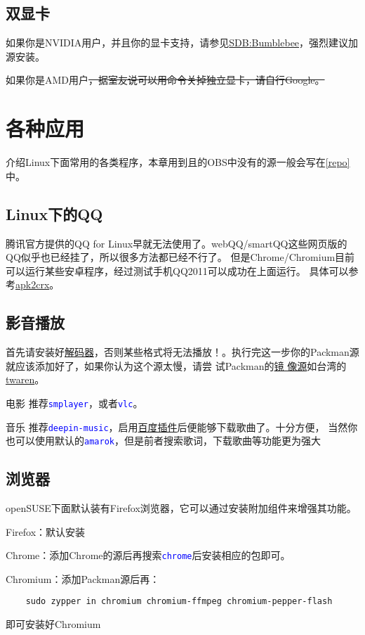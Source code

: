 \documentclass[10pt,openany]{book}
\newcommand{\soft}[1]{\texttt{\textcolor{blue}{#1}}}
\begin{document}
\section[双显卡]{双显卡}
如果你是NVIDIA用户，并且你的显卡支持，请参见\href{https://zh.opensuse.org/SDB:Bumblebee}{SDB:Bumblebee}，强烈建议加源安装。

如果你是AMD用户\sout{，据室友说可以用命令关掉独立显卡，请自行Google。}
\chapter{各种应用}
介绍Linux下面常用的各类程序，本章用到且的OBS中没有的源一般会写在\ref{repo}中。
\section{Linux下的QQ}
腾讯官方提供的QQ for Linux早就无法使用了。webQQ/smartQQ这些网页版的QQ似乎也已经挂了，所以很多方法都已经不行了。
但是Chrome/Chromium目前可以运行某些安卓程序，经过测试手机QQ2011可以成功在上面运行。
具体可以参考\href{http://huodong.ustc.edu.cn/Crx}{apk2crx}。
\section{影音播放}
{\color{orange}首先请安装好\href{https://lug.ustc.edu.cn/sites/opensuse-guide/codecs.php}{解码器}，否则某些格式将无法播放！}。执行完这一步你的Packman源
就应该添加好了，如果你认为这个源太慢，请尝
试Packman的\href{http://packman.links2linux.org/mirrors}{镜%
像源}如台湾的\href{http://ftp.twaren.net/Linux/Packman/}{twaren}。
\begin{compactdesc}
 \item[电影] 推荐\soft{smplayer}，或者\soft{vlc}。
 \item[音乐] 推荐\soft{deepin-music}，启用\href{https://forum.suse.org.cn/viewtopic.php?f=7&t=2530}{百度插件}后便能够下载歌曲了。十分方便，
当然你也可以使用默认的\soft{amarok}，但是前者搜索歌词，下载歌曲等功能更为强大
\end{compactdesc}
\section{浏览器}
openSUSE下面默认装有Firefox浏览器，它可以通过安装附加组件来增强其功能。

Firefox：默认安装

Chrome：添加Chrome的源后再搜索\soft{chrome}后安装相应的包即可。

Chromium：添加Packman源后再：
\begin{verbatim}
    sudo zypper in chromium chromium-ffmpeg chromium-pepper-flash
\end{verbatim}
即可安装好Chromium
\end{document}
